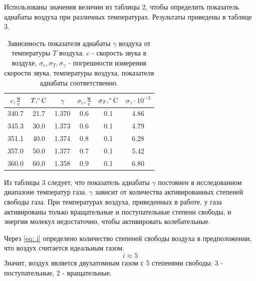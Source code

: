 Использованы значения величин из таблицы 2, чтобы определить показатель адиабаты воздуха при различных температурах. Результаты приведены в таблице 3.

\begin{table}[h]
    \centering
    \begin{tabular}{|c|c|c|c|c|c|}
    \hline
    $c, \frac{\text{м}}{\text{с}}$ & $T, \celsius$ & $\gamma$ & $\sigma_c, \frac{\text{м}}{\text{с}}$ &  $\sigma_T, \celsius$ & $\sigma_\gamma\cdot 10^{-3}$ \\ \hline
    340.7   & 21.7 & 1.370 & 0.6 & 0.1 & 4.86 \\ \hline
    345.3   & 30.0 & 1.373 & 0.6 & 0.1 & 4.79 \\ \hline
    351.1   & 40.0 & 1.374 & 0.8 & 0.1 & 6.28 \\ \hline
    357.0   & 50.0 & 1.377 & 0.7 & 0.1 & 5.42 \\ \hline
    360.0   & 60.0 & 1.358 & 0.9 & 0.1 & 6.80 \\ \hline
\end{tabular}
    \caption{Зависимость показателя адиабаты $\gamma$ воздуха от температуры $T$ воздуха. $c$ - скорость звука в воздухе, $\sigma_c, \sigma_T, \sigma_\gamma$ - погрешности измерения скорости звука, температуры воздуха, показателя адиабаты соответственно.}
    \label{tab:t10}
\end{table}

Из таблицы 3 следует, что показатель адиабаты $\gamma$ постоянен в исследованном диапазоне температур газа. $\gamma$ зависит от количества активированных степеней свободы газа. При температурах воздуха, приведенных в работе, у газа активированы только вращательные и поступательные степени свободы, и энергии молекул недостаточно, чтобы активировать колебательные.

Через \eqref{eq: i} определено количество степеней свободы воздуха в предположении, что воздух считается идеальным газом.
\[ i \approx 5\]
Значит, воздух является двухатомным газом с 5 степенями свободы: 3 - поступательные, 2 - вращательные.

